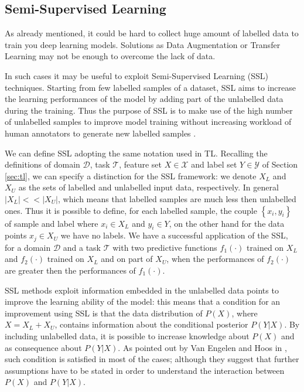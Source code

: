 \documentclass[../main.tex]{subfiles}
\begin{document}
\subsection{Semi-Supervised Learning}

As already mentioned, it could be hard to collect huge amount of labelled data to train you deep learning models. Solutions as Data Augmentation or Transfer Learning may not be enough to overcome the lack of data.


In such cases it may be useful to exploit Semi-Supervised Learning (SSL) techniques.
Starting from few labelled samples of a dataset, SSL aims to increase the learning performances of the model by adding part of the unlabelled data during the training. Thus the purpose of SSL is to make use of the high number of unlabelled samples to improve model training without increasing workload of human annotators to generate new labelled samples \cite{hady2013semi-supervised}.

We can define SSL adopting the same notation used in TL. 
Recalling the definitions of domain $\mathcal{D}$, task $\mathcal{T}$, feature set $X\in\mathcal{X}$ and label set $Y\in\mathcal{Y}$ of Section \ref{sec:tl}, we can specify a distinction for the SSL framework: we denote $X_{L}$ and $X_{U}$ as the sets of labelled and unlabelled input data, respectively. In general $|X_{L}|<<|X_{U}|$, which means that labelled samples are much less then unlabelled ones.
Thus it is possible to define, for each labelled sample, the couple $\left\{x_{i}, y_{i}\right\}$ of sample and label where $x_{i}\in X_{L}$ and $y_{i}\in Y$, on the other hand for the data points $x_{j}\in X_{U}$ we have no labels. 
We have a successful application of the SSL, for a domain $\mathcal{D}$ and a task $\mathcal{T}$ with two predictive functions $f_{1}(\cdot)$ trained on $X_{L}$ and $f_{2}(\cdot)$ trained on $X_{L}$ and on part of $X_{U}$, when the performances of $f_{2}(\cdot)$ are greater then the performances of $f_{1}(\cdot)$.

SSL methods exploit information embedded in the unlabelled data points to improve the learning ability of the model: this means that a condition for an improvement using SSL is that the data distribution of $P(X)$, where $X = X_{L} + X_{U}$, contains information about the conditional posterior $P(Y|X)$. By including unlabelled data, it is possible to increase knowledge about $P(X)$ and as consequence about $P(Y|X)$.
As pointed out by Van Engelen and Hoos in \cite{van2020survey}, such condition is satisfied in most of the cases; although they suggest that further assumptions have to be stated in order to understand the interaction between $P(X)$ and $P(Y|X)$.
\end{document}
